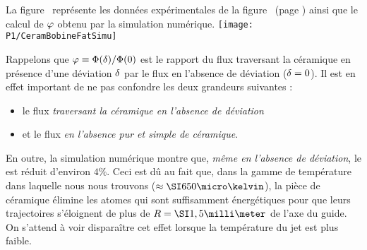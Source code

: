 La figure~ représente les données expérimentales de la figure~ (page \pageref{fig:CeramBobineFat}) ainsi que le calcul de ${\varphi}$ obtenu par la simulation numérique. 
\bfighs
\texttt{[image: P1/CeramBobineFatSimu]}
\label{fig:CeramBobineFatSimu}
\efigh


{\label{Rq:DeviZero}
Rappelons que ${\varphi}\equiv{{{\Phi}({\delta})} / {{\Phi}(0)}}$ est le rapport du flux traversant la céramique en présence d'une déviation ${\delta}$ par le flux en l'absence de déviation (${\delta}=0$). 
Il est en effet important de ne pas confondre les deux grandeurs suivantes :
\begin{itemize}
	\item le flux \emph{traversant la céramique en l'absence de déviation} 
	\item et le flux \emph{en l'absence pur et simple de céramique}. 
\end{itemize}
}
En outre, la simulation numérique montre que, \emph{même en l'absence de déviation}, le \fat est réduit d'environ $4\%$.
Ceci est dû au fait que, dans la gamme de température dans laquelle nous nous trouvons ($\approx\microK{650}$), la pièce de céramique élimine les atomes qui sont suffisamment énergétiques pour que leurs trajectoires s'éloignent de plus de $\CeramRay=\mm{1,5}$ de l'axe du guide. On s'attend à voir disparaître cet effet lorsque la température du jet est plus faible.

